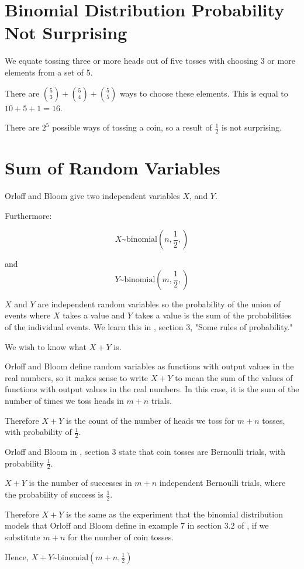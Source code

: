 \documentclass[a4paper,11pt]{article}
\begin{document}
\section{Binomial Distribution Probability Not Surprising}

We equate tossing three or more heads out of five tosses with choosing 3
or more elements from a set of 5.

There are $\binom{5}{3} + \binom{5}{4} + \binom{5}{5}$ ways to choose
these elements.  This is equal to $10 + 5 + 1 = 16$.

There are $2^{5}$ possible ways of tossing a coin, so a result of
$\frac{1}{2}$ is not surprising.

\section{Sum of Random Variables}

Orloff and Bloom give two independent variables $X$, and $Y$.

Furthermore:


\begin{equation}
X \text{\textasciitilde} \text{binomial} \left( n, \frac{1}{2}, \right)
\end{equation}

and \begin{equation}
Y \text{\textasciitilde} \text{binomial} \left( m, \frac{1}{2}, \right)
\end{equation}

$X$ and $Y$ are independent random variables so the probability
of the union of events where $X$ takes a value and $Y$ takes a value
is the sum of the probabilities of the individual events.  We learn
this in \cite{reading2}, section 3, "Some rules of probability."

We wish to know what $X + Y$ is.

Orloff and Bloom define random variables as functions with output values
in the real numbers, so it makes sense to write $X+Y$ to mean the
sum of the values of functions with output values in the real numbers.
In this case, it is the sum of the number of times we toss heads in
$m+n$ trials.

Therefore $X+Y$ is the count of the number of heads we toss
for $m+n$ tosses, with probability of $\frac{1}{2}$.

Orloff and Bloom in \cite{reading4}, section 3 state that coin tosses
are Bernoulli trials, with probability $\frac{1}{2}$.

$X+Y$ is the number of successes in $m+n$ independent Bernoulli trials,
where the  probability of success is $\frac{1}{2}$.

Therefore $X+Y$ is the same as  the experiment that the binomial distribution
models that Orloff and Bloom define in example $7$ in section 3.2 of 
\cite{reading4}, if we substitute $m+n$ for the number of coin tosses.  

Hence, $X+Y \text{\textasciitilde} \text{binomial} \left(m+n, \frac{1}{2}
\right)$

\printbibliography{}
\end{document}
